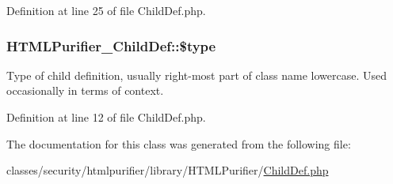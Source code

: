 Definition at line 25 of file Child\+Def.\+php.

\hypertarget{classHTMLPurifier__ChildDef_a3b9246b900d9c5d6107cb82cea62180d}{
\subsubsection[{\$type}]{\setlength{\rightskip}{0pt plus 5cm}H\+T\+M\+L\+Purifier\+\_\+\+Child\+Def\+::\$type}}\label{classHTMLPurifier__ChildDef_a3b9246b900d9c5d6107cb82cea62180d}
Type of child definition, usually right-\/most part of class name lowercase. Used occasionally in terms of context. 

Definition at line 12 of file Child\+Def.\+php.



The documentation for this class was generated from the following file\+:\begin{DoxyCompactItemize}
\item 
classes/security/htmlpurifier/library/\+H\+T\+M\+L\+Purifier/\hyperlink{ChildDef_8php}{Child\+Def.\+php}\end{DoxyCompactItemize}
